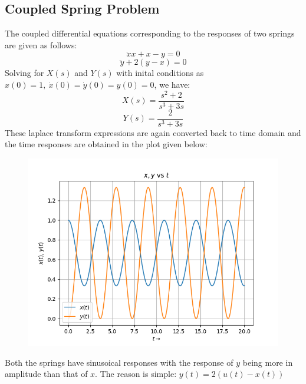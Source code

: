 \documentclass[12pt, a4paper]{article}
\begin{document}
\subsection{Coupled Spring Problem}
The coupled differential equations corresponding to the responses of two springs are given as follows:
\begin{equation*}
    \ddot xx+x-y=0 
\end{equation*}
\begin{equation*}
    \ddot y+2(y-x)=0
\end{equation*}
Solving for $X(s)$ and $Y(s)$ with inital conditions as $x(0)=1,\ \dot x(0)=\dot y(0)=y(0)=0$, we have:
\begin{equation*}
    X(s) = \frac{s^{2}+2}{s^{3}+3s}
\end{equation*}
\begin{equation*}
    Y(s) = \frac{2}{s^{3}+3s}
\end{equation*}
These laplace transform expressions are again converted back to time domain and the time responses are obtained in the plot given below:
\begin{figure}[H]
    \centering
    \includegraphics[scale = 0.8]{Figure_8.png}
    \label{fig:sample}
\end{figure}
\begin{center}
    Both the springs have sinusoical responses with the response of $y$ being more in amplitude than that of $x$. The reason is simple: $y(t) = 2(u(t)-x(t))$
\end{center}
\end{document}

